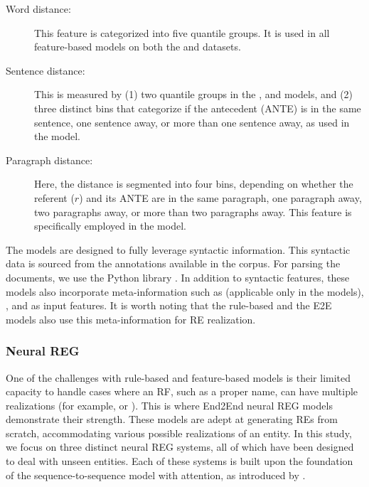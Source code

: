 \begin{description}
	\item[Word distance:] This feature is categorized into five quantile groups. It is used in all feature-based models on both the \webnlg and \wsj datasets.
	\item[Sentence distance:] This is measured by (1) two quantile groups in the \webnlg {},  and \wsj {} models, and (2) three distinct bins that categorize if the antecedent (ANTE) is in the same sentence, one sentence away, or more than one sentence away, as used in the \wsj {} model.
	\item[Paragraph distance:] Here, the distance is segmented into four bins, depending on whether the referent ($r$) and its ANTE are in the same paragraph, one paragraph away, two paragraphs away, or more than two paragraphs away. This feature is specifically employed in the \wsj {} model.
\end{description}


The  models are designed to fully leverage syntactic information. This syntactic data is sourced from the annotations available in the \onto corpus. For parsing the \webnlg documents, we use the Python library . In addition to syntactic features, these models also incorporate meta-information such as  (applicable only in the \wsj models), , and  as input features. It is worth noting that the rule-based and the E2E models also use this meta-information for RE realization.


\subsubsection{Neural REG}

One of the challenges with rule-based and feature-based models is their limited capacity to handle cases where an RF, such as a proper name, can have multiple realizations (for example,  or ). This is where End2End neural REG models demonstrate their strength. These models are adept at generating REs from scratch, accommodating various possible realizations of an entity. In this study, we focus on three distinct neural REG systems, all of which have been designed to deal with unseen entities. Each of these systems is built upon the foundation of the sequence-to-sequence model with attention, as introduced by \citet{bahdanau2014neural}. 

